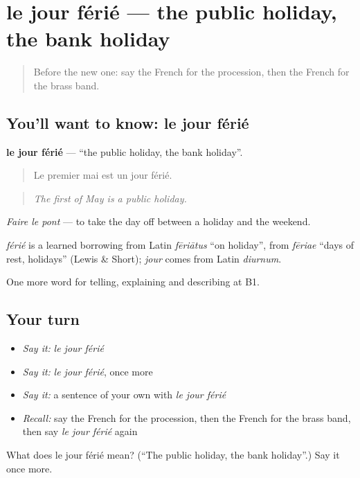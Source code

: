 \section[le jour férié]{le jour férié — the public holiday, the bank holiday}

\label{lesson:FR-C316-jour-ferie}



\begin{quote}
Before the new one: say the French for the procession, then the French for the brass band.
\end{quote}

\subsection*{You'll want to know: le jour férié}
\textbf{le jour férié} — \textquotedblleft{}the public holiday, the bank holiday\textquotedblright{}.

\begin{quote}
Le premier mai est un jour férié.
\end{quote}

\begin{quote}
\emph{The first of May is a public holiday.}
\end{quote}

\emph{Faire le pont} — to take the day off between a holiday and the weekend.

\begin{cousinweb}
\emph{férié} is a learned borrowing from Latin \emph{fēriātus} \textquotedblleft{}on holiday\textquotedblright{}, from \emph{fēriae} \textquotedblleft{}days of rest, holidays\textquotedblright{} (Lewis \& Short); \emph{jour} comes from Latin \emph{diurnum}.
\end{cousinweb}

\begin{grammarlens}[title={What you've built}]
One more word for telling, explaining and describing at B1.
\end{grammarlens}

\subsection*{Your turn}
\begin{itemize}
\raggedright
  \item \emph{Say it:} \emph{le jour férié}
  \item \emph{Say it:} \emph{le jour férié}, once more
  \item \emph{Say it:} a sentence of your own with \emph{le jour férié}
  \item \emph{Recall:} say the French for the procession, then the French for the brass band, then say \emph{le jour férié} again
\end{itemize}

\begin{tcolorbox}[breakable,colback=teal!4,colframe=teal!35!black,title={Before you move on}]
What does le jour férié mean? (\textquotedblleft{}The public holiday, the bank holiday\textquotedblright{}.) Say it once more.
\end{tcolorbox}
